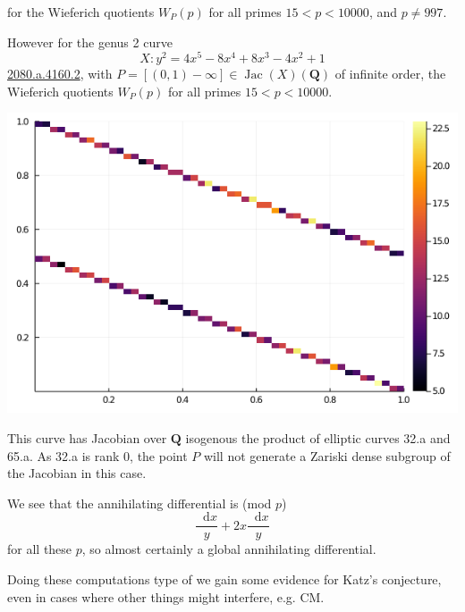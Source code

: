 \documentclass[oneside,11pt,]{article}
\DeclareMathOperator{\Jac}{Jac}
\newcommand{\diff}{\mathop{}\!\mathrm{d}}
\newcommand{\lb}{[}
\newcommand{\rb}{]}
\newcommand{\lt}{<}
\newcommand{\QQ}{\mathbf{Q}}
\begin{document}
for the Wieferich quotients \(W_P(p)\) for all primes \(15 \lt  p \lt  10000\), and \(p \ne 997\).%

However for the genus 2 curve%
\begin{equation*}
X\colon  y^2 = 4x^5 - 8x^4 + 8x^3 - 4x^2 + 1
\end{equation*}
\href{https://www.lmfdb.org/Genus2Curve/Q/2080/a/4160/2}{2080.a.4160.2}, with \(P = \lb (0,1) - \infty \rb \in \Jac(X)(\QQ)\) of infinite order, the Wieferich quotients \(W_P(p)\) for all primes \(15 \lt  p \lt  10000\).

\includegraphics[width=0.9\linewidth]{2080.png}

This curve has Jacobian over \(\QQ\) isogenous the product of elliptic curves 32.a and 65.a. As 32.a is rank 0, the point \(P\) will not generate a Zariski dense subgroup of the Jacobian in this case.%

We see that the annihilating differential is (mod $p$)
\begin{equation*}
\frac{\diff x}{y} +  2x\frac{\diff x}{y}
\end{equation*}
for all these $p$, so almost certainly a global annihilating differential.

Doing these computations type of we gain some evidence for Katz's conjecture, even in cases where other things might interfere, e.g. CM.
\end{document}
